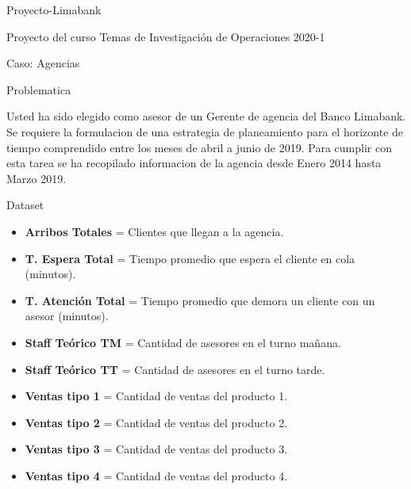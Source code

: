 \documentclass[
  ignorenonframetext,
]{beamer}
\author{}
\date{\vspace{-2.5em}}
\providecommand{\tightlist}{%
  \setlength{\itemsep}{0pt}\setlength{\parskip}{0pt}}
\begin{document}
\begin{frame}[fragile]{Proyecto-Limabank}
\protect\hypertarget{proyecto-limabank}{}

Proyecto del curso Temas de Investigación de Operaciones 2020-1

\begin{block}{Caso: Agencias}

\begin{block}{Problematica}

Usted ha sido elegido como asesor de un Gerente de agencia del Banco
Limabank. Se requiere la formulacion de una estrategia de planeamiento
para el horizonte de tiempo comprendido entre los meses de abril a junio
de 2019. Para cumplir con esta tarea se ha recopilado informacion de la
agencia desde Enero 2014 hasta Marzo 2019.

\end{block}

\begin{block}{Dataset}

\begin{itemize}
\tightlist
\item
  \textbf{Arribos Totales} = Clientes que llegan a la agencia.\\
\item
  \textbf{T. Espera Total} = Tiempo promedio que espera el cliente en
  cola (minutos).\\
\item
  \textbf{T. Atención Total} = Tiempo promedio que demora un cliente con
  un asesor (minutos).\\
\item
  \textbf{Staff Teórico TM} = Cantidad de asesores en el turno mañana.\\
\item
  \textbf{Staff Teórico TT} = Cantidad de asesores en el turno tarde.\\
\item
  \textbf{Ventas tipo 1} = Cantidad de ventas del producto 1.\\
\item
  \textbf{Ventas tipo 2} = Cantidad de ventas del producto 2.\\
\item
  \textbf{Ventas tipo 3} = Cantidad de ventas del producto 3.\\
\item
  \textbf{Ventas tipo 4} = Cantidad de ventas del producto 4.
\end{itemize}


\end{block}
\end{block}
\end{frame}
\end{document}
